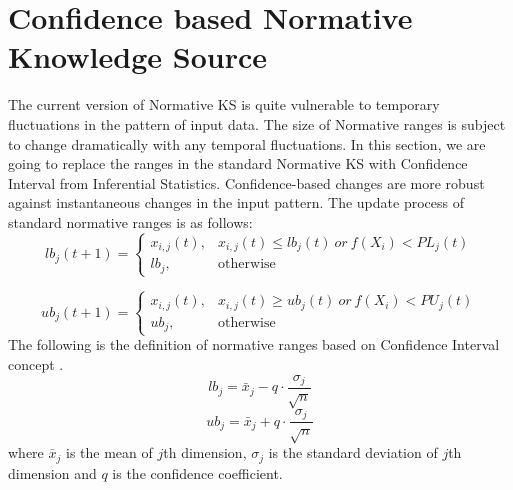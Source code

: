 \section{Confidence based Normative Knowledge Source}
The current version of Normative KS is quite vulnerable to temporary fluctuations in the pattern of input data. The size of Normative ranges is subject to change dramatically with any temporal fluctuations. In this section, we are going to replace the ranges in the standard Normative KS with Confidence Interval from Inferential Statistics. Confidence-based changes are more robust against instantaneous changes in the input pattern. The update process of standard normative ranges is as follows:
\begin{equation}
lb_{j}(t+1) = \begin{cases} x_{i,j}(t), & x_{i,j}(t)\leq lb_{j}(t)\:or\:f(X_{i})<PL_{j}(t)  \\ lb_{j}, & \mbox{otherwise} \end{cases}
\end{equation}

\begin{equation}
ub_{j}(t+1) = \begin{cases} x_{i,j}(t), & x_{i,j}(t)\ge ub_{j}(t)\:or\:f(X_{i})<PU_{j}(t)  \\ ub_{j}, & \mbox{otherwise} \end{cases} 
\end{equation}%
The following is the definition of normative ranges based on Confidence Interval concept \citet{proakis1985probability}.
\begin{equation}
lb_{j}=\bar{x}_{j}-q\cdot\dfrac{\sigma_{j}}{\sqrt{n}}
\end{equation}
\begin{equation}
ub_{j}=\bar{x}_{j}+q\cdot\dfrac{\sigma_{j}}{\sqrt{n}}
\end{equation}
where 
$\bar{x}_{j}$ is the mean of $j$th dimension, $\sigma_{j}$ is the standard deviation of $j$th dimension and $q$ is the confidence coefficient.




